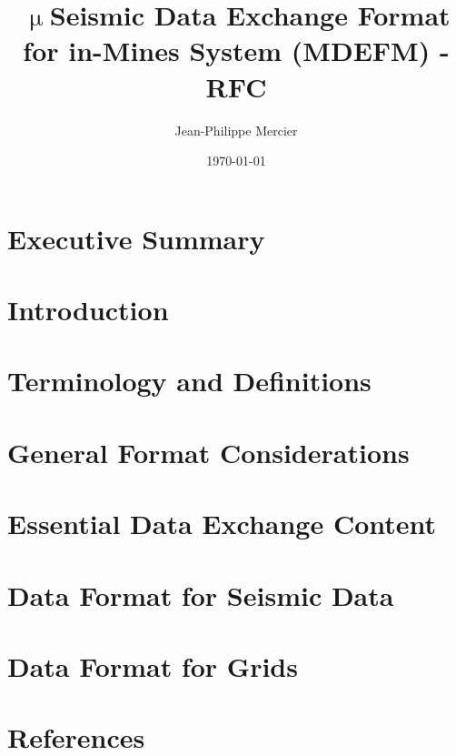 \documentclass[12pt]{article}
\begin{document}
\title{$\upmu$Seismic Data Exchange Format for in-Mines System (MDEFM) - RFC}
\author{Jean-Philippe Mercier}
\date{\today}
\maketitle

\newpage
\section*{Executive Summary}

\lipsum[1-2] %

\newpage

\tableofcontents
\pagebreak

\section{Introduction}


\section{Terminology and Definitions}


\section{General Format Considerations}


\section{Essential Data Exchange Content}


\section{Data Format for Seismic Data}


\section{Data Format for Grids}


\newpage
\clearpage
\printglossary[type=\acronymtype,title=List of Acronyms]

\newpage
\section{References}
\end{document}
